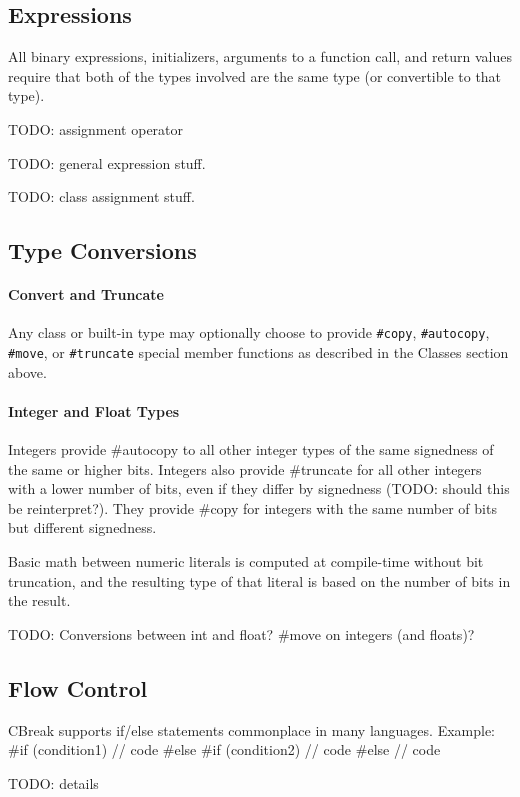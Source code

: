 \documentclass{article}
\newcommand{\code}[1]{\colorbox{light-gray}{\texttt{#1}}}
\newenvironment{codebox} {\snugshade\verbatim} {\endverbatim\endsnugshade}
\newcommand{\breakingparagraph}[1]{\paragraph{#1}\mbox{}\medbreak}
\begin{document}
\subsection{Expressions}

All binary expressions, initializers, arguments to a function call, and return values require that both of the types involved are the same type (or convertible to that type).

TODO: assignment operator

TODO: general expression stuff.

TODO: class assignment stuff.

\subsection{Type Conversions}

\breakingparagraph{Convert and Truncate}

Any class or built-in type may optionally choose to provide \code{\#copy}, \code{\#autocopy}, \code{\#move}, or \code{\#truncate} special member functions as described in the Classes section above.

\breakingparagraph{Integer and Float Types}

Integers provide \#autocopy to all other integer types of the same signedness of the same or higher bits.  Integers also provide \#truncate for all other integers with a lower number of bits, even if they differ by signedness (TODO: should this be reinterpret?).  They provide \#copy for integers with the same number of bits but different signedness.

Basic math between numeric literals is computed at compile-time without bit truncation, and the resulting type of that literal is based on the number of bits in the result.

TODO: Conversions between int and float?  \#move on integers (and floats)?

\subsection{Flow Control}

CBreak supports if/else statements commonplace in many languages.  Example:
\begin{codebox}
#if (condition1)
{
    // code
}
#else #if (condition2)
{
    // code
}
#else
{
    // code
}
\end{codebox}

TODO: details
\end{document}
